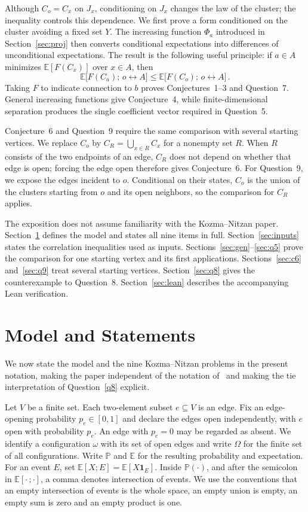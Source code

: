 \documentclass[11pt]{article}
\theoremstyle{definition}
\theoremstyle{remark}
\newcommand{\PP}{\mathbb P}
\newcommand{\EE}{\mathbb E}
\newcommand{\one}{\mathbf 1}
\newcommand{\con}{\leftrightarrow}
\begin{document}
Although $C_o=C_x$ on $J_x$, conditioning on $J_x$ changes the law of the cluster; the
inequality controls this dependence. We first prove a form conditioned on the cluster
avoiding a fixed set $Y$. The increasing function $\Phi_a$ introduced in
Section~\ref{sec:proj} then converts conditional expectations into differences of
unconditional expectations. The
result is the following useful principle: if $a\in A$ minimizes $\EE[F(C_x)]$ over
$x\in A$, then
\[
  \EE\bigl[F(C_a);\,o\con A\bigr]
  \leq \EE\bigl[F(C_o);\,o\con A\bigr] \,.
\]
Taking $F$ to indicate connection to $b$ proves Conjectures~1--3 and Question~7. General
increasing functions give Conjecture~4, while finite-dimensional separation produces the
single coefficient vector required in Question~5.

Conjecture~6 and Question~9 require the same comparison with several starting vertices.
We replace $C_o$ by $C_R=\bigcup_{x\in R}C_x$ for a nonempty set $R$. When $R$ consists
of the two endpoints of an edge, $C_R$ does not depend on whether that edge is open; forcing
the edge open therefore gives Conjecture~6. For Question~9, we expose the edges incident
to $o$. Conditional on their states, $C_o$ is the union of the clusters starting from $o$
and its open neighbors, so the comparison for $C_R$ applies.

The exposition does not assume familiarity with the Kozma--Nitzan paper. Section~\ref{sec:model}
defines the model and states all nine items in full. Section~\ref{sec:inputs} states the
correlation inequalities used as inputs. Sections~\ref{sec:gen}--\ref{sec:q5} prove the
comparison for one starting vertex and its first applications. Sections~\ref{sec:c6}
and~\ref{sec:q9} treat several starting vertices. Section~\ref{sec:q8} gives the
counterexample to Question~8. Section~\ref{sec:lean} describes the accompanying Lean
verification.

\section{Model and Statements}\label{sec:model}

We now state the model and the nine Kozma--Nitzan problems in the present notation, making
the paper independent of the notation of~\cite{KN} and making the tie interpretation of
Question~\ref{q8} explicit.

Let $V$ be a finite set. Each two-element subset $e\subseteq V$ is an edge. Fix an
edge-opening probability $p_e\in[0,1]$ and declare the edges open independently, with $e$
open with probability $p_e$. An edge with $p_e=0$ may be regarded as absent. We identify a
configuration $\omega$ with its set of open edges and write $\Omega$ for the finite set of
all configurations. Write $\PP$ and $\EE$ for the resulting probability and expectation.
For an event $E$, set $\EE[X;E]=\EE[X\one_E]$. Inside $\PP(\cdot)$, and after the
semicolon in $\EE[\cdot\,;\cdot]$, a comma denotes intersection of events. We use the
conventions that an empty intersection of events is the whole space, an empty union is
empty, an empty sum is zero and an empty product is one.
\end{document}
